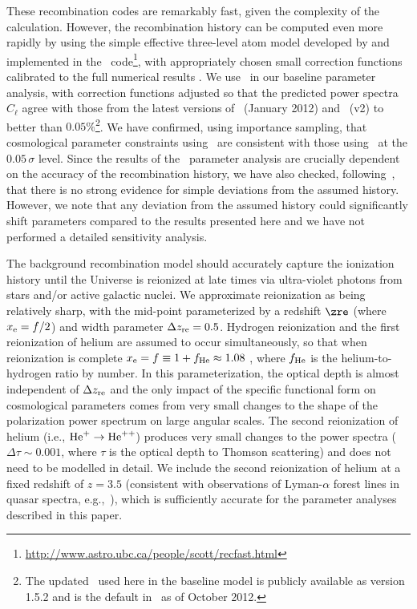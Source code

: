 These recombination codes are remarkably fast,  given the complexity of the calculation.
However, the recombination history can be computed even more rapidly by
using the simple effective three-level atom model developed by
\cite{Seager:1999km} and implemented in the \RECFAST\
code\footnote{\url{http://www.astro.ubc.ca/people/scott/recfast.html}},
with appropriately chosen small correction functions calibrated to the
full numerical results \citep{Wong:2007ym,RubinoMartin:2009ry,Shaw:2011ez}.
We use \RECFAST\ in our baseline parameter analysis, with correction functions
adjusted so that the predicted power spectra $C_\ell$ agree with those from
the latest versions of \HYREC\ (January 2012) and \COSMOREC\ (v2) to
better than $ 0.05\%$\footnote{The updated \RECFAST\ used here in the baseline model is
publicly available as version 1.5.2 and is the default in \CAMB\ as of
October 2012.}.
We have confirmed, using importance sampling, that cosmological parameter
constraints using \RECFAST\ are consistent with those using \COSMOREC\ at
the $0.05\,\sigma$ level.
Since the results of the \planck\ parameter analysis are crucially dependent
on the accuracy of the recombination history, we have also checked, following~\cite{Lewis:2006ym},
that there is no strong evidence for simple deviations from the assumed history. However, we note that any deviation from
the assumed history could significantly shift parameters compared to the results presented here and we have not
performed a detailed sensitivity analysis.

The background recombination model should accurately capture the
ionization history until the Universe is reionized at late times via
ultra-violet photons from stars and/or active galactic nuclei.  We
approximate reionization as being relatively sharp, with the mid-point
parameterized by a redshift $\zre$ (where $x_{\rm e}=f/2$) and width
parameter $\Delta z_{\rm re}=0.5$.  Hydrogen reionization and the
first reionization of helium are assumed to occur simultaneously, so
that when reionization is complete $x_{\rm e }= f \equiv
1+f_{\rm{He}}\approx 1.08$ \citep{Lewis:2008wr}, where $f_{\rm He}$ is the
helium-to-hydrogen ratio by number.  In this
parameterization, the optical depth is almost independent of $\Delta
z_{\rm re}$ and the only impact of the specific functional form on
cosmological parameters comes from very small changes to the shape of
the polarization power spectrum on large angular scales.  The second reionization of
helium (i.e., ${\rm He}^{+}\to{\rm He}^{++}$) produces
very small changes to the power spectra ($\Delta\tau \sim 0.001$,
where $\tau$ is the optical depth to Thomson scattering) and does not
need to be modelled in detail.  We include the second reionization of
helium at a fixed redshift of $z=3.5$ (consistent with observations of
Lyman-$\alpha$ forest lines in quasar spectra, e.g.,~\citealt{Becker:11}),
which is sufficiently accurate for the parameter analyses described in
this paper.

